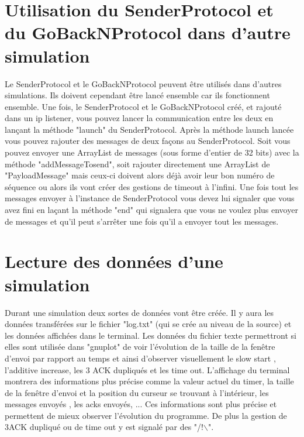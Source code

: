 \documentclass[a4paper,10pt]{article}
\begin{document}
\section{Utilisation du SenderProtocol et du GoBackNProtocol dans d'autre simulation}
Le SenderProtocol et le GoBackNProtocol peuvent être utilisés dans d'autres simulations. Ils doivent cependant être lancé ensemble car ils fonctionnent ensemble. Une fois, le SenderProtocol et le GoBackNProtocol créé, et rajouté dans un ip listener, vous pouvez lancer la communication entre les deux en lançant la méthode "launch" du SenderProtocol. Après la méthode launch lancée vous pouvez rajouter des messages de deux façons au SenderProtocol. Soit vous pouvez envoyer  une ArrayList de messages (sous forme d'entier de 32 bits) avec la méthode "addMessageTosend", soit rajouter directement une ArrayList de "PayloadMessage" mais ceux-ci doivent alors déjà avoir leur bon numéro de séquence ou alors ils vont créer des gestions de timeout à l'infini. Une fois tout les messages envoyer à l'instance de SenderProtocol vous devez lui signaler que vous avez fini en laçant la méthode "end" qui signalera que vous ne voulez plus envoyer de messages et qu'il peut s'arrêter une fois qu'il a envoyer tout les messages.\\

\section{Lecture des données d'une simulation}
Durant une simulation deux sortes de données vont être créée. Il y aura les données transférées sur le fichier "log.txt" (qui se crée au niveau de la source) et les données affichées dans le terminal. Les données du fichier texte permettront si elles sont utilisée dans "gnuplot" de voir l'évolution de la taille de la fenêtre d'envoi par rapport au temps et ainsi d'observer visuellement le slow start , l'additive increase, les 3 ACK dupliqués et les time out. L'affichage du terminal montrera des informations plus précise comme la valeur actuel du timer, la taille de la fenêtre d'envoi et la position du curseur se trouvant à l'intérieur, les messages envoyés , les acks envoyés, ... Ces informations sont plus précise et permettent de mieux observer l'évolution du programme. De plus la gestion de 3ACK dupliqué ou de time out y est signalé par des "/!$\backslash$".\\
\end{document}
